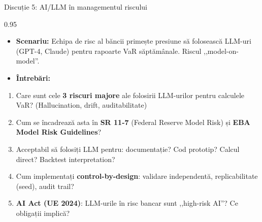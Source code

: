 \documentclass[9pt, aspectratio=169, t]{beamer}
\begin{document}
\begin{frame}[shrink=10]{Discuție 5: AI/LLM în managementul riscului}
\begin{cminipage}{0.95\textwidth}
    \begin{itemize}\setlength{\itemsep}{0pt}
        \item \textbf{Scenariu:} Echipa de risc al băncii primește presiune să folosească LLM-uri (GPT-4, Claude) pentru rapoarte VaR săptămânale. Riscul ,,model-on-model''.
        \item \textbf{Întrebări:}
    \end{itemize}
    \begin{enumerate}\setlength{\itemsep}{0pt}
        \item Care sunt cele \textbf{3 riscuri majore} ale folosirii LLM-urilor pentru calculele VaR? (Hallucination, drift, auditabilitate)
        \item Cum se încadrează asta în \textbf{SR 11-7} (Federal Reserve Model Risk) și \textbf{EBA Model Risk Guidelines}?
        \item Acceptabil să folosiți LLM pentru: documentație? Cod prototip? Calcul direct? Backtest interpretation?
        \item Cum implementați \textbf{control-by-design}: validare independentă, replicabilitate (seed), audit trail?
        \item \textbf{AI Act (UE 2024)}: LLM-urile în risc bancar sunt ,,high-risk AI''? Ce obligații implică?
    \end{enumerate}
\end{cminipage}
\end{frame}
\end{document}
